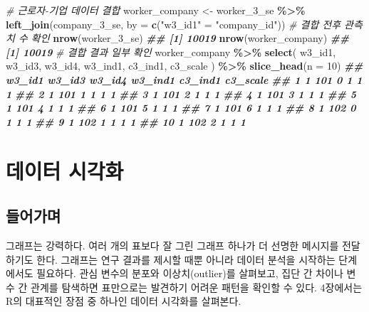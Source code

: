 \documentclass[
]{book}
\newenvironment{Shaded}{\begin{snugshade}}{\end{snugshade}}
\newcommand{\AttributeTok}[1]{\textcolor[rgb]{0.13,0.29,0.53}{#1}}
\newcommand{\CommentTok}[1]{\textcolor[rgb]{0.56,0.35,0.01}{\textit{#1}}}
\newcommand{\DecValTok}[1]{\textcolor[rgb]{0.00,0.00,0.81}{#1}}
\newcommand{\DocumentationTok}[1]{\textcolor[rgb]{0.56,0.35,0.01}{\textbf{\textit{#1}}}}
\newcommand{\FunctionTok}[1]{\textcolor[rgb]{0.13,0.29,0.53}{\textbf{#1}}}
\newcommand{\NormalTok}[1]{#1}
\newcommand{\OtherTok}[1]{\textcolor[rgb]{0.56,0.35,0.01}{#1}}
\newcommand{\SpecialCharTok}[1]{\textcolor[rgb]{0.81,0.36,0.00}{\textbf{#1}}}
\newcommand{\StringTok}[1]{\textcolor[rgb]{0.31,0.60,0.02}{#1}}
\begin{document}
\begin{Shaded}
\begin{Highlighting}[]
\CommentTok{\# 근로자{-}기업 데이터 결합}
\NormalTok{worker\_company }\OtherTok{\textless{}{-}}\NormalTok{ worker\_3\_se }\SpecialCharTok{\%\textgreater{}\%}
  \FunctionTok{left\_join}\NormalTok{(company\_3\_se, }\AttributeTok{by =} \FunctionTok{c}\NormalTok{(}\StringTok{"w3\_id1"} \OtherTok{=} \StringTok{"company\_id"}\NormalTok{))}
\CommentTok{\# 결합 전후 관측치 수 확인}
\FunctionTok{nrow}\NormalTok{(worker\_3\_se)}
\DocumentationTok{\#\# [1] 10019}
\FunctionTok{nrow}\NormalTok{(worker\_company)}
\DocumentationTok{\#\# [1] 10019}
\CommentTok{\# 결합 결과 일부 확인}
\NormalTok{worker\_company }\SpecialCharTok{\%\textgreater{}\%}
  \FunctionTok{select}\NormalTok{(}
\NormalTok{    w3\_id1, w3\_id3, w3\_id4,}
\NormalTok{    w3\_ind1, c3\_ind1, c3\_scale}
\NormalTok{  ) }\SpecialCharTok{\%\textgreater{}\%}
  \FunctionTok{slice\_head}\NormalTok{(}\AttributeTok{n =} \DecValTok{10}\NormalTok{)}
\DocumentationTok{\#\#    w3\_id1 w3\_id3 w3\_id4 w3\_ind1 c3\_ind1 c3\_scale}
\DocumentationTok{\#\# 1       1    101      0       1       1        1}
\DocumentationTok{\#\# 2       1    101      1       1       1        1}
\DocumentationTok{\#\# 3       1    101      2       1       1        1}
\DocumentationTok{\#\# 4       1    101      3       1       1        1}
\DocumentationTok{\#\# 5       1    101      4       1       1        1}
\DocumentationTok{\#\# 6       1    101      5       1       1        1}
\DocumentationTok{\#\# 7       1    101      6       1       1        1}
\DocumentationTok{\#\# 8       1    102      0       1       1        1}
\DocumentationTok{\#\# 9       1    102      1       1       1        1}
\DocumentationTok{\#\# 10      1    102      2       1       1        1}
\end{Highlighting}
\end{Shaded}

\chapter{데이터 시각화}\label{graph}

\section{들어가며}\label{uxb4e4uxc5b4uxac00uxba70-1}

그래프는 강력하다. 여러 개의 표보다 잘 그린 그래프 하나가 더 선명한 메시지를 전달하기도 한다. 그래프는 연구 결과를 제시할 때뿐 아니라 데이터 분석을 시작하는 단계에서도 필요하다. 관심 변수의 분포와 이상치(outlier)를 살펴보고, 집단 간 차이나 변수 간 관계를 탐색하면 표만으로는 발견하기 어려운 패턴을 확인할 수 있다. 4장에서는 R의 대표적인 장점 중 하나인 데이터 시각화를 살펴본다.
\end{document}
